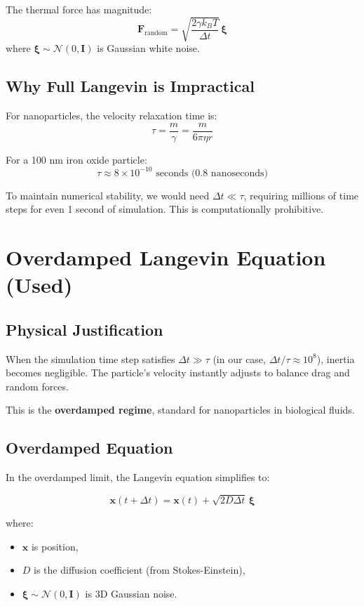 \documentclass{article}
\begin{document}
The thermal force has magnitude:
\[
\mathbf{F}_{\text{random}} = \sqrt{\frac{2\gamma k_B T}{\Delta t}} \, \boldsymbol{\xi}
\]
where $\boldsymbol{\xi} \sim \mathcal{N}(0, \mathbf{I})$ is Gaussian white noise.

\subsection{Why Full Langevin is Impractical}

For nanoparticles, the velocity relaxation time is:
\[
\tau = \frac{m}{\gamma} = \frac{m}{6\pi\eta r}
\]

For a 100 nm iron oxide particle:
\[
\tau \approx 8 \times 10^{-10} \text{ seconds (0.8 nanoseconds)}
\]

To maintain numerical stability, we would need $\Delta t \ll \tau$, requiring millions of time steps for even 1 second of simulation. This is computationally prohibitive.

\section{Overdamped Langevin Equation (Used)}

\subsection{Physical Justification}

When the simulation time step satisfies $\Delta t \gg \tau$ (in our case, $\Delta t / \tau \approx 10^8$), 
inertia becomes negligible. The particle's velocity instantly adjusts to balance drag and random forces.

This is the \textbf{overdamped regime}, standard for nanoparticles in biological fluids.

\subsection{Overdamped Equation}

In the overdamped limit, the Langevin equation simplifies to:

\[
\mathbf{x}(t + \Delta t) = \mathbf{x}(t) + \sqrt{2D\Delta t} \, \boldsymbol{\xi}
\]

where:
\begin{itemize}
    \item $\mathbf{x}$ is position,
    \item $D$ is the diffusion coefficient (from Stokes-Einstein),
    \item $\boldsymbol{\xi} \sim \mathcal{N}(0, \mathbf{I})$ is 3D Gaussian noise.
\end{itemize}
\end{document}
